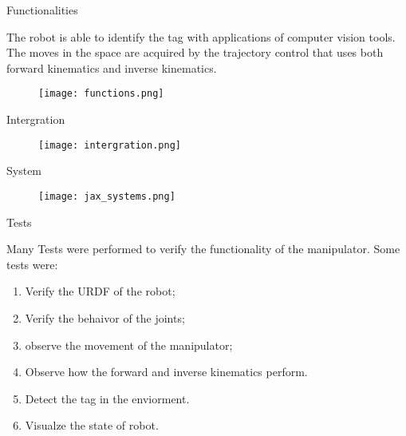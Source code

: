 \begin{frame}[c]{Functionalities}

    The robot is able to identify the tag with applications of  computer vision tools. The moves in the space are acquired by the trajectory control that uses both forward kinematics and inverse kinematics.

    \begin{center}
            \begin{figure}
                \texttt{[image: functions.png]}
            \end{figure}
    \end{center}


\end{frame}





\begin{frame}[c]{Intergration}

    

    \begin{center}
            \begin{figure}
                \texttt{[image: intergration.png]}
            \end{figure}
    \end{center}


\end{frame}


\begin{frame}[c]{System}

    

    \begin{center}
            \begin{figure}
                \texttt{[image: jax\_systems.png]}
            \end{figure}
    \end{center}


\end{frame}




\begin{frame}[c]{Tests}

    Many Tests were performed to verify the functionality of the manipulator. Some tests were:

    \begin{enumerate}
        \item Verify  the URDF of the robot;
        \item Verify  the behaivor of the joints;
        \item observe the movement of the manipulator;
        \item Observe how the forward  and inverse kinematics perform.
        \item Detect the tag in the enviorment.
        \item Visualze the state of robot.
    \end{enumerate}

  


\end{frame}



